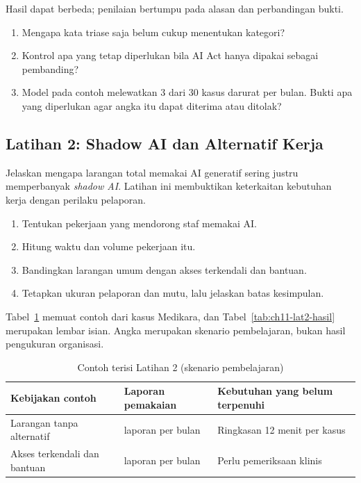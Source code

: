 Hasil dapat berbeda; penilaian bertumpu pada alasan dan perbandingan bukti.
\begin{enumerate}
  \item Mengapa kata triase saja belum cukup menentukan kategori?
  \item Kontrol apa yang tetap diperlukan bila AI Act hanya dipakai sebagai pembanding?
  \item Model pada contoh melewatkan 3 dari 30 kasus darurat per bulan. Bukti apa yang diperlukan
  agar angka itu dapat diterima atau ditolak?
\end{enumerate}

\subsection*{Latihan 2: Shadow AI dan Alternatif Kerja}

Jelaskan mengapa larangan total memakai AI generatif sering justru memperbanyak \textit{shadow AI}.
Latihan ini membuktikan keterkaitan kebutuhan kerja dengan perilaku pelaporan.

\begin{enumerate}
  \item Tentukan pekerjaan yang mendorong staf memakai AI.
  \item Hitung waktu dan volume pekerjaan itu.
  \item Bandingkan larangan umum dengan akses terkendali dan bantuan.
  \item Tetapkan ukuran pelaporan dan mutu, lalu jelaskan batas kesimpulan.
\end{enumerate}

Tabel~\ref{tab:ch11-lat2-contoh} memuat contoh dari kasus Medikara, dan
Tabel~\ref{tab:ch11-lat2-hasil} merupakan lembar isian. Angka merupakan skenario pembelajaran, bukan
hasil pengukuran organisasi.

\begin{table}[!htb]
  \centering\small
  \caption{Contoh terisi Latihan 2 (skenario pembelajaran)}\label{tab:ch11-lat2-contoh}
  \begin{tabularx}{\textwidth}{|>{\raggedright\arraybackslash}X|>{\raggedright\arraybackslash}X|>{\raggedright\arraybackslash}X|}
    \hline
    \textbf{Kebijakan contoh} & \textbf{Laporan pemakaian} & \textbf{Kebutuhan yang belum terpenuhi}
    \\ \hline
    Larangan tanpa alternatif & 2 laporan per bulan & Ringkasan 12 menit per kasus \\ \hline
    Akses terkendali dan bantuan & 15 laporan per bulan & Perlu pemeriksaan klinis \\ \hline
  \end{tabularx}
\end{table}

